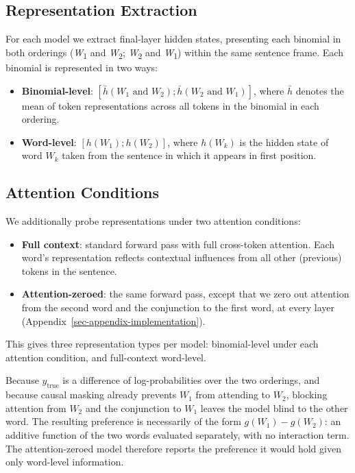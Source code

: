 \documentclass[11pt]{article}
\providecommand{\tightlist}{%
  \setlength{\itemsep}{0pt}\setlength{\parskip}{0pt}}
\begin{document}
\subsection{Representation Extraction}\label{representation-extraction}

For each model we extract final-layer hidden states, presenting each
binomial in both orderings (\emph{W}\textsubscript{1} and
\emph{W}\textsubscript{2}; \emph{W}\textsubscript{2} and
\emph{W}\textsubscript{1}) within the same sentence frame. Each binomial
is represented in two ways:

\begin{itemize}
\tightlist
\item
  \textbf{Binomial-level}:
  \([\bar{h}(W_1\text{ and }W_2); \bar{h}(W_2\text{ and }W_1)]\), where
  \(\bar{h}\) denotes the mean of token representations across all
  tokens in the binomial in each ordering.
\item
  \textbf{Word-level}: \([h(W_1); h(W_2)]\), where \(h(W_k)\) is the
  hidden state of word \(W_k\) taken from the sentence in which it
  appears in first position.
\end{itemize}

\subsection{Attention Conditions}\label{attention-conditions}

We additionally probe representations under two attention conditions:

\begin{itemize}
\tightlist
\item
  \textbf{Full context}: standard forward pass with full cross-token
  attention. Each word's representation reflects contextual influences
  from all other (previous) tokens in the sentence.
\item
  \textbf{Attention-zeroed}: the same forward pass, except that we zero
  out attention from the second word and the conjunction to the first
  word, at every layer (Appendix~\ref{sec-appendix-implementation}).
\end{itemize}

This gives three representation types per model: binomial-level under
each attention condition, and full-context word-level.

Because \(y_{\text{true}}\) is a difference of log-probabilities over
the two orderings, and because causal masking already prevents \(W_1\)
from attending to \(W_2\), blocking attention from \(W_2\) and the
conjunction to \(W_1\) leaves the model blind to the other word. The
resulting preference is necessarily of the form \(g(W_1) - g(W_2)\): an
additive function of the two words evaluated separately, with no
interaction term. The attention-zeroed model therefore reports the
preference it would hold given only word-level information.
\end{document}
